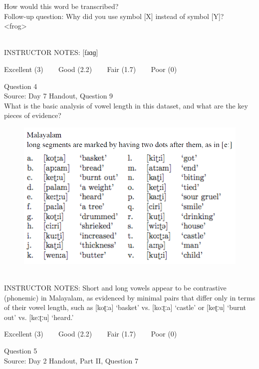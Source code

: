\documentclass[12pt]{article}
\begin{document}
How would this word be transcribed?\\ Follow-up question: Why did you use symbol [X] instead of symbol [Y]?\\

<frog>


~\\
INSTRUCTOR NOTES: [fɹɑɡ]


\vfill
Excellent (3) ~~~ Good (2.2) ~~~ Fair (1.7) ~~~ Poor (0)
\newpage

{\large Question 4}\\

Source: Day 7 Handout, Question 9\\

What is the basic analysis of vowel length in this dataset, and what are the key pieces of evidence?\\

\begin{figure}[H]
\includegraphics{../images/malayalam.png}
\end{figure}

~\\
INSTRUCTOR NOTES: Short and long vowels appear to be contrastive (phonemic) in Malayalam, as evidenced by minimal pairs that differ only in terms of their vowel length, such as [koʈːa] ‘basket’ vs. [koːʈːa] ‘castle’ or [keʈːu] ‘burnt out’ vs. [keːʈːu] ‘heard.’


\vfill
Excellent (3) ~~~ Good (2.2) ~~~ Fair (1.7) ~~~ Poor (0)
\newpage

{\large Question 5}\\

Source: Day 2 Handout, Part II, Question 7\\
\end{document}
